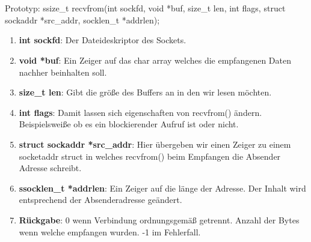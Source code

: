\\\\
Prototyp: ssize\_t recvfrom(int sockfd, void *buf, size\_t len, int flags, struct sockaddr *src\_addr, socklen\_t *addrlen);
\begin{enumerate}
    \item \textbf{int sockfd}: Der Dateideskriptor des Sockets.
    \item \textbf{void *buf}: Ein Zeiger auf das char array welches die empfangenen Daten nachher beinhalten soll. 
    \item \textbf{size\_t len}: Gibt die größe des Buffers an in den wir lesen möchten.
    \item \textbf{int flags}: Damit lassen sich eigenschaften von recvfrom() ändern. Beispielsweiße ob es ein blockierender Aufruf ist oder nicht.
    \item \textbf{struct sockaddr *src\_addr}: Hier übergeben wir einen Zeiger zu einem socketaddr struct in welches recvfrom() beim Empfangen die Absender Adresse schreibt.
    \item \textbf{ssocklen\_t *addrlen}: Ein Zeiger auf die länge der Adresse. Der Inhalt wird entsprechend der Absenderadresse geändert.
    \item \textbf{Rückgabe}: 0 wenn Verbindung ordnungsgemäß getrennt. Anzahl der Bytes wenn welche empfangen wurden. -1 im Fehlerfall.
\end{enumerate} 
\ \\%
